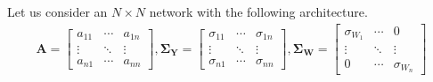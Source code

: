 \documentclass{article}
\begin{document}
Let us consider an $N \times N$ network with the following architecture.
\begin{equation}
\begin{aligned}
\mathbf{A} =
\begin{bmatrix}
    a_{11}  & \cdots & a_{1n} \\
     \vdots & \ddots & \vdots  \\
    a_{n1}  & \cdots & a_{nn}
\end{bmatrix},
\mathbf{\Sigma_\mathbf{Y}}=
\begin{bmatrix}
    \sigma_{11}  & \cdots & \sigma_{1n} \\
     \vdots & \ddots & \vdots  \\
    \sigma_{n1}  & \cdots & \sigma_{nn}
\end{bmatrix},
\mathbf{\Sigma_\mathbf{W}} =
\begin{bmatrix}
    \sigma_{W_1}  & \cdots & 0 \\
     \vdots & \ddots & \vdots  \\
    0  & \cdots & \sigma_{W_n}
\end{bmatrix}
\end{aligned}
\label{eq:nByn_network_append}
\end{equation}
\end{document}
